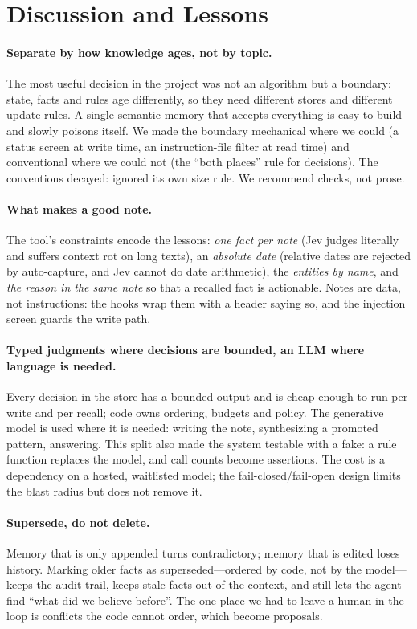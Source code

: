 \section{Discussion and Lessons}
\label{sec:discussion}

\paragraph{Separate by how knowledge ages, not by topic.} The most useful decision in the project was not an algorithm but a boundary: state, facts and rules age differently, so they need different stores and different update rules. A single semantic memory that accepts everything is easy to build and slowly poisons itself. We made the boundary mechanical where we could (a status screen at write time, an instruction-file filter at read time) and conventional where we could not (the ``both places'' rule for decisions). The conventions decayed:  ignored its own size rule. We recommend checks, not prose.

\paragraph{What makes a good note.} The tool's constraints encode the lessons: \emph{one fact per note} (Jev judges literally and suffers context rot on long texts), an \emph{absolute date} (relative dates are rejected by auto-capture, and Jev cannot do date arithmetic), the \emph{entities by name}, and \emph{the reason in the same note} so that a recalled fact is actionable. Notes are data, not instructions: the hooks wrap them with a header saying so, and the injection screen guards the write path.

\paragraph{Typed judgments where decisions are bounded, an LLM where language is needed.} Every decision in the store has a bounded output and is cheap enough to run per write and per recall; code owns ordering, budgets and policy. The generative model is used where it is needed: writing the note, synthesizing a promoted pattern, answering. This split also made the system testable with a fake: a rule function replaces the model, and call counts become assertions. The cost is a dependency on a hosted, waitlisted model; the fail-closed/fail-open design limits the blast radius but does not remove it.

\paragraph{Supersede, do not delete.} Memory that is only appended turns contradictory; memory that is edited loses history. Marking older facts as superseded---ordered by code, not by the model---keeps the audit trail, keeps stale facts out of the context, and still lets the agent find ``what did we believe before''. The one place we had to leave a human-in-the-loop is conflicts the code cannot order, which become proposals.


